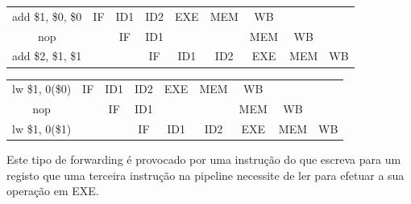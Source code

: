 \documentclass[pdftex,12pt,a4paper]{report}
\begin{document}
\begin{table}[!htb]
\centering
\label{my-label}
\begin{tabular}{ccc|c|c|c|c|cc}
\cline{2-7}
\multicolumn{1}{c|}{add \$1, \$0, \$0} & \multicolumn{1}{c|}{IF} & ID1 & ID2 & EXE                                                & \cellcolor[HTML]{F8A102}MEM                        & \cellcolor[HTML]{FFCC67}WB  &                          &                         \\ \cline{2-8}
nop                                  & \multicolumn{1}{c|}{}   & IF  & ID1 & \cellcolor[HTML]{FFFFFF}{\color[HTML]{000000} ID2} & \cellcolor[HTML]{FFFFFF}{\color[HTML]{333333} EXE} & MEM                         & \multicolumn{1}{c|}{WB}  &                         \\ \cline{3-9} 
add \$2, \$1, \$1                      &                         &     & IF  & ID1                                                & ID2                                                & \cellcolor[HTML]{F8A102}EXE & \multicolumn{1}{c|}{MEM} & \multicolumn{1}{c|}{WB} \\ \cline{4-9} 
\end{tabular}
\end{table}

\begin{table}[!htb]
\centering
\begin{tabular}{ccc|c|c|c|c|cc}
\cline{2-7}
\multicolumn{1}{c|}{lw \$1, 0(\$0)} & \multicolumn{1}{c|}{IF} & ID1 & ID2 & EXE                                                & \cellcolor[HTML]{F8A102}MEM                        & \cellcolor[HTML]{FFCC67}WB  &                          &                         \\ \cline{2-8}
nop                               & \multicolumn{1}{c|}{}   & IF  & ID1 & \cellcolor[HTML]{FFFFFF}{\color[HTML]{000000} ID2} & \cellcolor[HTML]{FFFFFF}{\color[HTML]{333333} EXE} & MEM                         & \multicolumn{1}{c|}{WB}  &                         \\ \cline{3-9} 
lw \$1, 0(\$1)                      &                         &     & IF  & ID1                                                & ID2                                                & \cellcolor[HTML]{F8A102}EXE & \multicolumn{1}{c|}{MEM} & \multicolumn{1}{c|}{WB} \\ \cline{4-9} 
\end{tabular}
\end{table}

Este tipo de forwarding é provocado por uma instrução do que escreva para um registo que uma terceira instrução na pipeline necessite de ler para efetuar a sua operação em EXE. 
\end{document}

